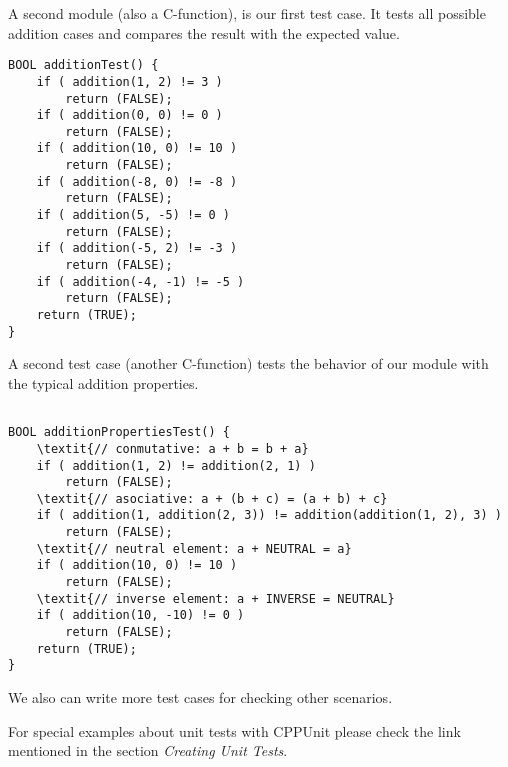 A second module (also a C-function), is our first test case. It
tests all possible addition cases and compares the result with the
expected value.

\begin{verbatim}
BOOL additionTest() {
    if ( addition(1, 2) != 3 )
        return (FALSE);
    if ( addition(0, 0) != 0 )
        return (FALSE);
    if ( addition(10, 0) != 10 )
        return (FALSE);
    if ( addition(-8, 0) != -8 )
        return (FALSE);
    if ( addition(5, -5) != 0 )
        return (FALSE);
    if ( addition(-5, 2) != -3 )
        return (FALSE);
    if ( addition(-4, -1) != -5 )
        return (FALSE);
    return (TRUE);
}
\end{verbatim}

A second test case (another C-function) tests the behavior of our
module with the typical addition properties.

\begin{verbatim}

BOOL additionPropertiesTest() {
    \textit{// conmutative: a + b = b + a}
    if ( addition(1, 2) != addition(2, 1) )
        return (FALSE);
    \textit{// asociative: a + (b + c) = (a + b) + c}
    if ( addition(1, addition(2, 3)) != addition(addition(1, 2), 3) )
        return (FALSE);
    \textit{// neutral element: a + NEUTRAL = a}
    if ( addition(10, 0) != 10 )
        return (FALSE);
    \textit{// inverse element: a + INVERSE = NEUTRAL}
    if ( addition(10, -10) != 0 )
        return (FALSE);
    return (TRUE);
}
\end{verbatim}

We also can write more test cases for checking other scenarios.

For special examples about unit tests with CPPUnit please check
the link mentioned in the section \textit{Creating Unit Tests}.
